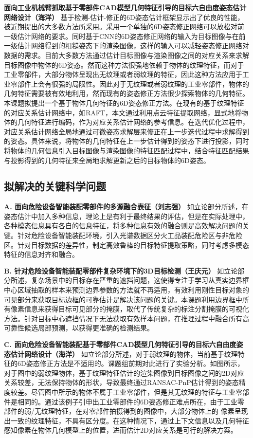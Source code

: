 \documentclass[12pt]{article}
\begin{document}
\textbf{面向工业机械臂抓取基于零部件CAD模型几何特征引导的目标六自由度姿态估计网络设计（海洋）}
基于检测-估计-修正的6D姿态估计框架显示出了优良的性能，被近期提出的大多数方法所采用。采用一个单独的6D姿态修正网络可以放松对前一级估计网络的要求。同时基于CNN的6D姿态修正网络的输入为目标图像与在前一级估计网络得到的粗糙姿态下的渲染图像，这样的输入可以减轻姿态修正网络对数据的需求。目前大多数方法通过估计目标图像与渲染图像之间的对应关系来求解目标图像中物体的6D姿态。然而这种方法很强地依赖于物体的纹理特征，而对于工业零部件，大部分物体呈现出无纹理或者弱纹理的特征，因此这种方法应用于工业零部件上会有很强的局限性。因此对于无纹理或者弱纹理的工业零部件，物体的几何特征需要被有效地利用，然而现有的姿态修正方法很少探索物体的几何特征。
本课题拟提出一个基于物体几何特征的6D姿态修正方法。在现有的基于纹理特征的对应关系估计网络中，如RAFT，本文通过利用点云特征提取网络，显式地将物体的几何特征进行编码，作为对应关系估计网络的参考信息。在迭代优化过程中，对应关系估计网络全局地通过可微姿态求解层来修正在上一步迭代过程中求解得到的姿态。具体来说，将物体的几何特征在上一步估计得到的姿态下进行投影，同时将物体的几何信息引入目标图像与渲染图像的特征匹配过程中，结合特征匹配结果与投影得到的几何特征来全局地求解更新之后的目标物体的6D姿态。



\subsection{拟解决的关键科学问题}

\textbf{A. 面向危险设备智能装配零部件的多源融合表征（刘志强）}
如立论部分所述，在姿态估计中加入多种信息，理论上是有利于最终结果的评估，但是在实际处理中，各种模态信息具有各自的信息特征，将多种信息有效的融合则是高效解决问题的关键。针对危险设备智能装配环境，引入光谱数据区分火工品装配危险区与非危险区。针对目标数据的差异性，制定高效鲁棒的目标特征提取策略，同时考虑多模态特征的信息对齐和融合。

\textbf{B. 针对危险设备智能装配零部件复杂环境下的3D目标检测（王庆元）}
如立论部分所述，复杂场景中的目标存在严重的遮挡问题，这使得专注于学习从真实边界框中心区域抽取的样本来预测边界参数的方法就不再适用，有效利用刚性目标对象的可见部分来获取目标边框的可靠估计是解决该问题的关键。本课题利用边界框中所有像素信息来获得目标可见部分的掩膜，取代了传统复杂的标注分割掩膜的可视化方法。针对目标中心遮挡情况下无法获取有效样本问题，在推理过程中融合所有高可靠性候选局部预测，以获得更准确的检测结果。

\textbf{C. 面向危险设备智能装配基于零部件CAD模型几何特征引导的目标六自由度姿态估计网络设计（海洋）}
如立论部分所述，对于弱纹理的物体，当前基于纹理特征的6D姿态修正方法是不适用的。课题组前期对此进行了实验分析。如图所示，对于图中的弱纹理物体，基于纹理特征估计的渲染图像到目标图像之间的2D对应关系较差，无法保持物体的形状，导致最终通过RANSAC-PnP估计得到的姿态精度较差。尽管图中所示的物体不属于工业零部件，但是其无纹理的特征与工业零部件是相同的。通过该例子引申出工业零部件的6D姿态修正难点所在，由于工业零部件的弱/无纹理特征，在对零部件拍摄得到的图像中，大部分物体上的 像素呈现出一致的纹理特征，不具有区分度。在这种情况下，通过上下文信息以及几何特征感知像素在物体几何模型上的位置，进而估计2D对应关系是可行的解决方案。
\end{document}
